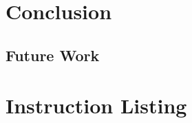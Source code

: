 \documentclass[oneside]{book}
\begin{document}

\chapter{Conclusion}

\section{Future Work}


\appendix

\chapter{Instruction Listing}


\end{document}
